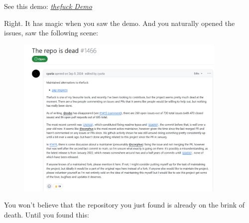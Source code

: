 \documentclass[12pt]{ctexart}
\begin{document}
See this demo: \href{https://raw.githubusercontent.com/Octopus058/Introduction-to-Linux/refs/heads/main/assets/Linux/2.5%20What's%20the%20first%20word%20when%20messing%20up%20a%20command/example.gif}{\textit{thefuck Demo}}

Right. It has magic when you saw the demo. And you naturally opened the
issues, saw the following scene:

\begin{figure}[H]
    \centering
    \includegraphics[width=0.9\textwidth,keepaspectratio]{assets/Linux/2.5 What's the first word when messing up a command/2.png}
\end{figure}

You won't believe that the repository you just found is
already on the brink of death. Until you found this:
\end{document}
